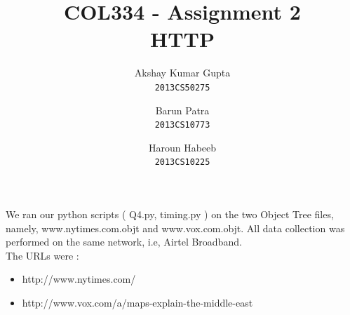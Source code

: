 \documentclass[12pt]{article}
\begin{document}
\title{COL334 - Assignment 2\\ HTTP}
\author{Akshay Kumar Gupta\\\texttt{2013CS50275} \and  Barun Patra\\\texttt{2013CS10773} \and Haroun Habeeb\\\texttt{2013CS10225}}
\date{}
\maketitle
\noindent 
We ran our python scripts ( Q4.py, timing.py ) on the two Object Tree files, namely, www.nytimes.com.objt and www.vox.com.objt. All data collection was performed on the same network, i.e, Airtel Broadband.\\
The URLs were : 
\begin{itemize}
\item http://www.nytimes.com/
\item http://www.vox.com/a/maps-explain-the-middle-east
\end{itemize}
\end{document}
